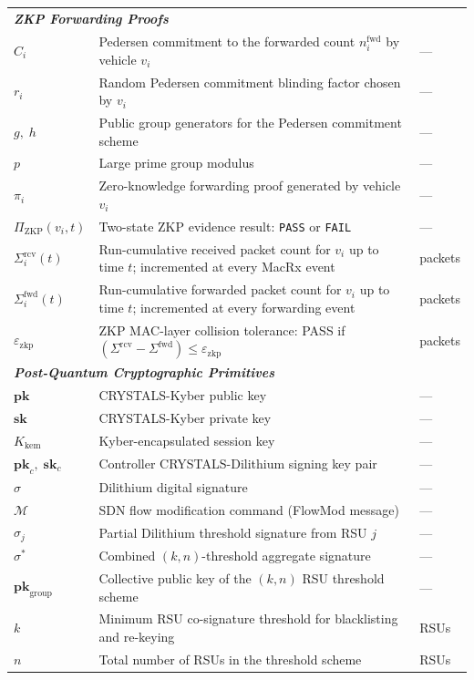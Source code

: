 \documentclass[12pt, a4paper]{report}
\begin{document}
\begin{longtable}{p{2.6cm} p{9.2cm} p{1.9cm}}
\multicolumn{3}{l}{\textit{\textbf{ZKP Forwarding Proofs}}} \\[2pt]
$C_i$ & Pedersen commitment to the forwarded count $n_i^{\text{fwd}}$ by vehicle $v_i$ & --- \\
$r_i$ & Random Pedersen commitment blinding factor chosen by $v_i$ & --- \\
$g,\;h$ & Public group generators for the Pedersen commitment scheme & --- \\
$p$ & Large prime group modulus & --- \\
$\pi_i$ & Zero-knowledge forwarding proof generated by vehicle $v_i$ & --- \\
$\Pi_\mathrm{ZKP}(v_i,t)$ & Two-state ZKP evidence result: \texttt{PASS} or \texttt{FAIL} & --- \\
$\Sigma_i^{\mathrm{rcv}}(t)$ & Run-cumulative received packet count for $v_i$ up to time $t$; incremented at every MacRx event & packets \\
$\Sigma_i^{\mathrm{fwd}}(t)$ & Run-cumulative forwarded packet count for $v_i$ up to time $t$; incremented at every forwarding event & packets \\
$\varepsilon_{\mathrm{zkp}}$ & ZKP MAC-layer collision tolerance: PASS if $(\Sigma^{\mathrm{rcv}} - \Sigma^{\mathrm{fwd}}) \leq \varepsilon_{\mathrm{zkp}}$ & packets \\[6pt]

\multicolumn{3}{l}{\textit{\textbf{Post-Quantum Cryptographic Primitives}}} \\[2pt]
$\mathbf{pk}$ & CRYSTALS-Kyber public key & --- \\
$\mathbf{sk}$ & CRYSTALS-Kyber private key & --- \\
$K_{\text{kem}}$ & Kyber-encapsulated session key & --- \\
$\mathbf{pk}_c,\;\mathbf{sk}_c$ & Controller CRYSTALS-Dilithium signing key pair & --- \\
$\sigma$ & Dilithium digital signature & --- \\
$\mathcal{M}$ & SDN flow modification command (FlowMod message) & --- \\
$\sigma_j$ & Partial Dilithium threshold signature from RSU $j$ & --- \\
$\sigma^*$ & Combined $(k,n)$-threshold aggregate signature & --- \\
$\mathbf{pk}_\mathrm{group}$ & Collective public key of the $(k,n)$ RSU threshold scheme & --- \\
$k$ & Minimum RSU co-signature threshold for blacklisting and re-keying & RSUs \\
$n$ & Total number of RSUs in the threshold scheme & RSUs \\[6pt]


\end{longtable}
\end{document}
